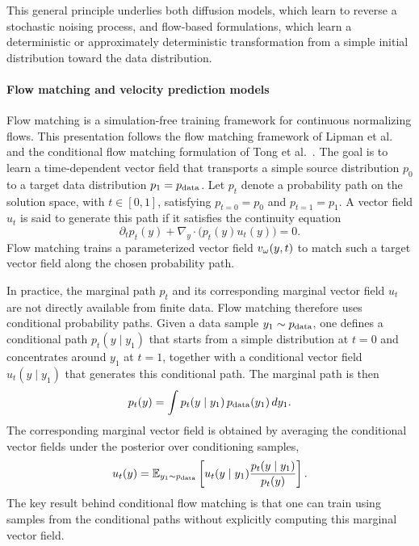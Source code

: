 This general principle underlies both diffusion models, which learn to reverse a stochastic noising process, and flow-based formulations, which learn a deterministic or approximately deterministic transformation from a simple initial distribution toward the data distribution.

\paragraph{Flow matching and velocity prediction models}
\label{par:background_flow_matching}

Flow matching is a simulation-free training framework for continuous normalizing flows. This presentation follows the flow matching framework of Lipman et al.~\cite{lipman_flow_2022} and the conditional flow matching formulation of Tong et al.~\cite{kerrigan_dynamic_2024}. The goal is to learn a time-dependent vector field that transports a simple source distribution $p_0$ to a target data distribution $p_1=p_{\mathrm{data}}$. Let $p_t$ denote a probability path on the solution space, with $t\in[0,1]$, satisfying $p_{t=0}=p_0$ and $p_{t=1}=p_1$. A vector field $u_t$ is said to generate this path if it satisfies the continuity equation
\begin{equation}
    \partial_t p_t(y) + \nabla_y \cdot \bigl(p_t(y) u_t(y)\bigr) = 0.
\end{equation}
Flow matching trains a parameterized vector field $v_{\omega}(y,t)$ to match such a target vector field along the chosen probability path.

In practice, the marginal path $p_t$ and its corresponding marginal vector field $u_t$ are not directly available from finite data. Flow matching therefore uses conditional probability paths. Given a data sample $y_1 \sim p_{\mathrm{data}}$, one defines a conditional path $p_t(y\mid y_1)$ that starts from a simple distribution at $t=0$ and concentrates around $y_1$ at $t=1$, together with a conditional vector field $u_t(y\mid y_1)$ that generates this conditional path. The marginal path is then
\begin{equation}
    p_t(y) = \int p_t(y\mid y_1) \, p_{\mathrm{data}}(y_1) \, dy_1.
\end{equation}
The corresponding marginal vector field is obtained by averaging the conditional vector fields under the posterior over conditioning samples,
\begin{equation}
    u_t(y)
    =
    \mathbb{E}_{y_1 \sim p_{\mathrm{data}}}
    \left[
        u_t(y\mid y_1)
        \frac{p_t(y\mid y_1)}{p_t(y)}
    \right].
\end{equation}
The key result behind conditional flow matching is that one can train using samples from the conditional paths without explicitly computing this marginal vector field.

